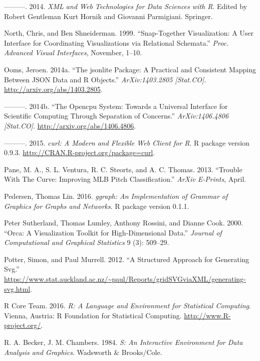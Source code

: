 \documentclass[12pt,]{isuthesis}
\begin{document}
\hypertarget{ref-nolan-lang}{}
---------. 2014. \emph{XML and Web Technologies for Data Sciences with
R}. Edited by Robert Gentleman Kurt Hornik and Giovanni Parmigiani.
Springer.

\hypertarget{ref-North:1999vi}{}
North, Chris, and Ben Shneiderman. 1999. ``Snap-Together Visualization:
A User Interface for Coordinating Visualizations via Relational
Schemata.'' \emph{Proc. Advanced Visual Interfaces}, November, 1--10.

\hypertarget{ref-jsonlite}{}
Ooms, Jeroen. 2014a. ``The jsonlite Package: A Practical and Consistent
Mapping Between JSON Data and R Objects.'' \emph{ArXiv:1403.2805
{[}Stat.CO{]}}. \url{http://arxiv.org/abs/1403.2805}.

\hypertarget{ref-opencpu}{}
---------. 2014b. ``The Opencpu System: Towards a Universal Interface
for Scientific Computing Through Separation of Concerns.''
\emph{ArXiv:1406.4806 {[}Stat.CO{]}}.
\url{http://arxiv.org/abs/1406.4806}.

\hypertarget{ref-curl}{}
---------. 2015. \emph{curl: A Modern and Flexible Web Client for R}. R
package version 0.9.3. \url{http://CRAN.R-project.org/package=curl}.

\hypertarget{ref-curve}{}
Pane, M. A., S. L. Ventura, R. C. Steorts, and A. C. Thomas. 2013.
``Trouble With The Curve: Improving MLB Pitch Classification.''
\emph{ArXiv E-Prints}, April.

\hypertarget{ref-ggraph}{}
Pedersen, Thomas Lin. 2016. \emph{ggraph: An Implementation of Grammar
of Graphics for Graphs and Networks}. R package version 0.1.1.

\hypertarget{ref-orca}{}
Peter Sutherland, Thomas Lumley, Anthony Rossini, and Dianne Cook. 2000.
``Orca: A Visualization Toolkit for High-Dimensional Data.''
\emph{Journal of Computational and Graphical Statistics} 9 (3): 509--29.

\hypertarget{ref-gridSVGreport}{}
Potter, Simon, and Paul Murrell. 2012. ``A Structured Approach for
Generating Svg.''
\url{https://www.stat.auckland.ac.nz/~paul/Reports/gridSVGviaXML/generating-svg.html}.

\hypertarget{ref-RCore}{}
R Core Team. 2016. \emph{R: A Language and Environment for Statistical
Computing}. Vienna, Austria: R Foundation for Statistical Computing.
\url{http://www.R-project.org/}.

\hypertarget{ref-S:1984}{}
R. A. Becker, J. M. Chambers. 1984. \emph{S: An Interactive Environment
for Data Analysis and Graphics}. Wadsworth \& Brooks/Cole.
\end{document}
